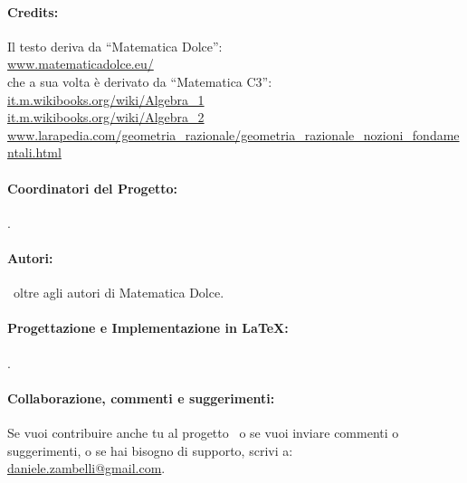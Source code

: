 {{\paragraph{Credits:} Il testo deriva da ``Matematica Dolce'':\\ 
\href{https://www.matematicadolce.eu/}{www.matematicadolce.eu/} \\
che a sua volta è derivato da ``Matematica C3'':\\
\href{https://it.m.wikibooks.org/wiki/Algebra_1}
{it.m.wikibooks.org/wiki/Algebra\_1}\\
\href{https://it.m.wikibooks.org/wiki/Algebra_2}
{it.m.wikibooks.org/wiki/Algebra\_2}\\
\href{https://www.larapedia.com/geometria_razionale/geometria_razionale_nozioni_fondamentali.html}
{www.larapedia.com/geometria\_razionale/geometria\_razionale\_nozioni\_fondamentali.html}

\vspace{-1em}
\paragraph{Coordinatori del Progetto:} \coord.

\vspace{-1em}
\paragraph{Autori:} \autori\ oltre agli autori di Matematica Dolce.


\vspace{-1em}
\paragraph{Progettazione e Implementazione in \LaTeX:} 
          {\texcol}.

\vspace{-1em}
\paragraph{Collaborazione, commenti e suggerimenti:} 
Se vuoi contribuire anche tu al progetto \serie\ o se  vuoi inviare 
commenti o suggerimenti, o se hai bisogno di supporto, scrivi a:\\
\href{mailto:daniele.zambelli@gmail.com}{daniele.zambelli@gmail.com}.

}}

